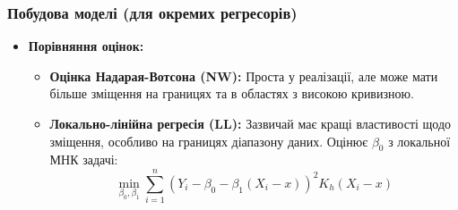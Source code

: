 ﻿\documentclass{beamer}
\begin{document}

\begin{frame}
  \frametitle{Побудова моделі (для окремих регресорів)}
  \begin{itemize}
    \item \textbf{Порівняння оцінок:}
        \begin{itemize}
            \item \textbf{Оцінка Надарая-Вотсона (NW):} Проста у реалізації, але може мати більше зміщення на границях та в областях з високою кривизною.
            \item \textbf{Локально-лінійна регресія (LL):} Зазвичай має кращі властивості щодо зміщення, особливо на границях діапазону даних. Оцінює $\beta_0$ з локальної МНК задачі:
            $$ \min_{\beta_0, \beta_1} \sum_{i=1}^{n} (Y_i - \beta_0 - \beta_1(X_i - x))^2 K_h(X_i - x) $$
        \end{itemize}
  \end{itemize}
\end{frame}
\end{document}
